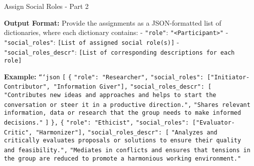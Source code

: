\begin{figure*}[t]
    \begin{AIbox}{Assign Social Roles - Part 2}
    \parbox[t]{\textwidth} {
        \textbf{Output Format:}  
        Provide the assignments as a JSON-formatted list of dictionaries, where each dictionary contains: \newline
        - \texttt{"role"}: \texttt{"<Participant>"}  
        - \texttt{"social\_roles"}: \texttt{[List of assigned social role(s)]}  
        - \texttt{"social\_roles\_descr"}: \texttt{[List of corresponding descriptions for each role]} \newline
        
        \textbf{Example:}  
        \texttt{```json} \newline
        \texttt{[} \newline
        \quad \texttt{\{} \newline
        \quad \quad \texttt{"role": "Researcher",} \newline
        \quad \quad \texttt{"social\_roles": ["Initiator-Contributor", "Information Giver"],} \newline
        \quad \quad \texttt{"social\_roles\_descr": [} \newline
        \quad \quad \quad \texttt{"Contributes new ideas and approaches and helps to start the conversation or steer it in a productive direction.",} \newline
        \quad \quad \quad \texttt{"Shares relevant information, data or research that the group needs to make informed decisions."} \newline
        \quad \quad \texttt{]} \newline
        \quad \texttt{\},} \newline
        \quad \texttt{\{} \newline
        \quad \quad \texttt{"role": "Ethicist",} \newline
        \quad \quad \texttt{"social\_roles": ["Evaluator-Critic", "Harmonizer"],} \newline
        \quad \quad \texttt{"social\_roles\_descr": [} \newline
        \quad \quad \quad \texttt{"Analyzes and critically evaluates proposals or solutions to ensure their quality and feasibility.",} \newline
        \quad \quad \quad \texttt{"Mediates in conflicts and ensures that tensions in the group are reduced to promote a harmonious working environment."} \newline
}
\end{AIbox}
\end{figure*}
